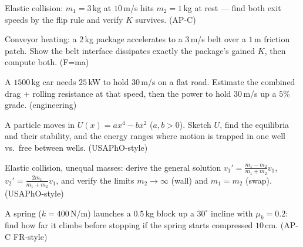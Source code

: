 \begin{exercise}[medium]
Elastic collision: $m_1=3$\,kg at $10$\,m/s hits $m_2=1$\,kg at rest ---
find both exit speeds by the flip rule and verify $K$ survives. (AP-C)
\end{exercise}
\begin{exercise}[medium]
Conveyor heating: a $2$\,kg package accelerates to a $3$\,m/s belt over a
$1$\,m friction patch. Show the belt interface dissipates exactly the
package's gained $K$, then compute both. (F=ma)
\end{exercise}
\begin{exercise}[medium]
A $1500$\,kg car needs $25$\,kW to hold $30$\,m/s on a flat road.
Estimate the combined drag + rolling resistance at that speed, then the
power to hold $30$\,m/s up a $5\%$ grade. (engineering)
\end{exercise}
\begin{exercise}[hard]
A particle moves in $U(x)=ax^{4}-bx^{2}$ ($a,b>0$). Sketch $U$, find the
equilibria and their stability, and the energy ranges where motion is
trapped in one well vs.\ free between wells. (USAPhO-style)
\end{exercise}
\begin{exercise}[hard]
Elastic collision, unequal masses: derive the general solution
$v_1'=\frac{m_1-m_2}{m_1+m_2}v_1$,
$v_2'=\frac{2m_1}{m_1+m_2}v_1$, and verify the limits
$m_2\to\infty$ (wall) and $m_1=m_2$ (swap). (USAPhO-style)
\end{exercise}
\begin{exercise}[medium]
A spring ($k=400$\,N/m) launches a $0.5$\,kg block up a $30^{\circ}$
incline with $\mu_k=0.2$: find how far it climbs before stopping if
the spring starts compressed $10$\,cm. (AP-C FR-style)
\end{exercise}
